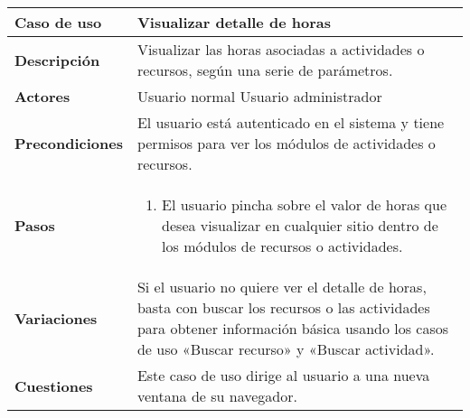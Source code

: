 \begin{tabular}{|p{1.25in}|p{3.65in}|}\hline
\textbf{Caso de uso} & \textbf{Visualizar detalle de horas}\\\hline\hline
\textbf{Descripción} & Visualizar las horas asociadas a actividades o recursos,
según una serie de parámetros. \\\hline
\textbf{Actores} & Usuario normal \newline Usuario administrador\\\hline
\textbf{Precondiciones} & El usuario está autenticado en el sistema y
tiene permisos para ver los módulos de actividades o recursos.\\\hline
\textbf{Pasos} &
  \begin{enumerate}
   \item El usuario pincha sobre el valor de horas que desea visualizar en
cualquier sitio dentro de los módulos de recursos o actividades.
  \end{enumerate}
\\\hline
\textbf{Variaciones} & Si el usuario no quiere ver el detalle de horas,
basta con buscar los recursos o las actividades para obtener información
básica usando los casos de uso «Buscar recurso» y «Buscar actividad».\\\hline
\textbf{Cuestiones} & Este caso de uso dirige al usuario a una nueva
ventana de su navegador.\\\hline
\end{tabular}

